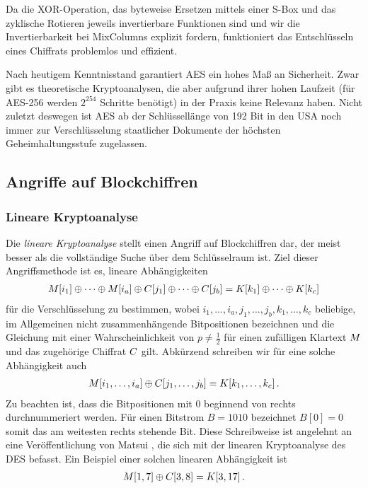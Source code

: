 Da die XOR-Operation, das byteweise Ersetzen mittels einer S-Box und das
zyklische Rotieren jeweils invertierbare Funktionen sind und wir die
Invertierbarkeit bei MixColumns explizit fordern, funktioniert das
Entschlüsseln eines Chiffrats problemlos und effizient. 

Nach heutigem Kenntnisstand garantiert AES ein hohes Maß an
Sicherheit. Zwar gibt es theoretische Kryptoanalysen, die aber aufgrund
ihrer hohen Laufzeit (für AES-256 werden $2^{254}$ Schritte benötigt) in
der Praxis keine Relevanz haben. Nicht zuletzt deswegen ist AES ab der
Schlüssellänge von 192 Bit in den USA noch immer zur Verschlüsselung
staatlicher Dokumente der höchsten Geheimhaltungsstufe zugelassen. 

\subsection{Angriffe auf Blockchiffren}
\subsubsection{Lineare Kryptoanalyse}\label{sssec:linKryptoanalyse}
Die \emph{lineare Kryptoanalyse} \indexLinCrypt stellt einen Angriff auf
Blockchiffren dar, der meist besser als die vollständige Suche über dem
Schlüsselraum ist. Ziel dieser Angriffsmethode ist es, lineare
Abhängigkeiten 
\begin{align}\label{approx}
  M[i_{1}] \oplus \dots \oplus M[i_{a}] \oplus C[j_{1}] \oplus \dots \oplus C[j_{b}] = K[k_{1}] \oplus \dots \oplus K[k_{c}]
\end{align}
für die Verschlüsselung zu bestimmen, wobei
$i_{1},\dots,i_{a},j_{1},\dots,j_{b},k_{1},\dots,k_{c}$ beliebige, im
Allgemeinen nicht zusammenhängende Bitpositionen bezeichnen und die
Gleichung mit einer Wahrscheinlichkeit von $p \neq \frac{1}{2}$ für
einen zufälligen Klartext $M$ und das zugehörige Chiffrat
$C$ gilt. Abkürzend schreiben wir für eine solche Abhängigkeit
auch 
\begin{align*}
  M[i_{1},\dots,i_{a}] \oplus C[j_{1},\dots,j_{b}] = K[k_{1},\dots,k_{c}]\, .
\end{align*}
Zu beachten ist, dass die Bitpositionen mit $0$ beginnend von rechts
durchnummeriert werden. 
\label{matsui-notation}Für einen Bitstrom $B = 1010$ bezeichnet $B[0] =
0$ somit das am weitesten rechts stehende Bit. Diese Schreibweise ist
angelehnt an eine Veröffentlichung von Matsui \cite{Matsui1994}, die
sich mit der linearen Kryptoanalyse des DES befasst. 
Ein Beispiel einer solchen linearen Abhängigkeit ist
\begin{align*}
  M[1, 7] \oplus C[3, 8] = K[3, 17]\, .
\end{align*}

